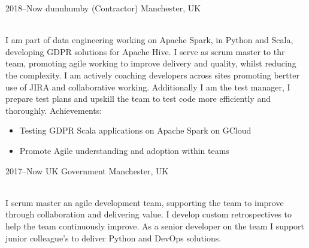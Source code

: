 \documentclass[]{cv-style}          %
\begin{document}
\begin{entrylist}
  \entry
  {2018--Now}
  {dunnhumby (Contractor)}
  {Manchester, UK}
  {\\
  I am part of data engineering working on Apache Spark, in Python and Scala, developing GDPR solutions for Apache Hive.
  I serve as scrum master to thr team, promoting agile working to improve delivery and quality, whilst reducing the complexity.
  I am actively coaching developers across sites promoting bertter use of JIRA and collaborative working.
  Additionally I am the test manager, I prepare test plans and upskill the team to test code more efficiently and thoroughly.
Achievements:
\begin{itemize}
  \item Testing GDPR Scala applications on Apache Spark on GCloud
  \item Promote Agile understanding and adoption within teams
\end{itemize}
}
\entry
  {2017--Now}
  {UK Government}
  {Manchester, UK}
  {\\
  I scrum master an agile development team, supporting the team to improve through collaboration and delivering value.
  I develop custom retrospectives to help the team continuously improve.
  As a senior developer on the team I support junior colleague's to deliver Python and DevOps solutions.

}
\end{entrylist}
\end{document}
